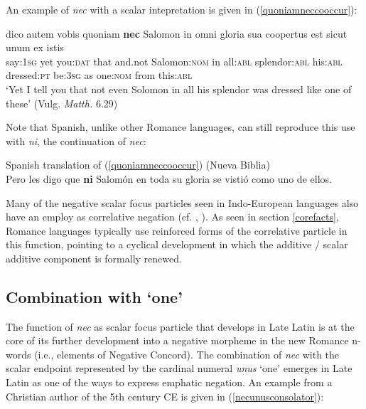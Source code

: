 \documentclass[output=paper,modfonts,nonflat,citecolor=brown,
showindex
]{langsci/langscibook}
\begin{document}
An example of {\emph{nec}} with a scalar intepretation is given in (\ref{quoniamneccooccur}):

{\begin{exe}
\ex \label{quoniamneccooccur} \gll dico autem vobis quoniam {\textbf{nec}} Salomon in omni gloria sua coopertus est sicut unum ex istis\\
say:{\textsc{1sg}} yet you:{\textsc{dat}} that and.not Salomon:{\textsc{nom}} in all:{\textsc{abl}} splendor:{\textsc{abl}} his:{\textsc{abl}} dressed:{\textsc{pt}} be:{\textsc{3sg}} as one:{\textsc{nom}} from this:{\textsc{abl}}\\

`Yet I tell you that not even Solomon in all his splendor was dressed like one of these' (Vulg. {\emph{Matth.}} 6.29)
\end{exe}}

\noindent Note that Spanish, unlike other Romance languages, can still reproduce this use with {\emph{ni}}, the continuation of {\emph{nec}}:

{\begin{exe}
\ex Spanish translation of (\ref{quoniamneccooccur}) (Nueva Biblia)\\
Pero les digo que {\textbf{ni}} Salom\'on en toda su gloria se visti\'o como uno de ellos.
\end{exe}}

\noindent Many of the negative scalar focus particles seen in Indo-European languages also have an employ as correlative negation (cf. \citealt[chapter 4]{Koenig91}, \citealt[]{Haspelmath07}). As seen in section \ref{corefacts}, Romance languages typically use reinforced forms of the correlative particle in this function, pointing to a cyclical development in which the additive / scalar additive component is formally renewed.

\subsection{Combination with `one'}

The function of {\emph{nec}} as scalar focus particle that develops in Late Latin is at the core of its further development into a negative morpheme in the new Romance n-words (i.e., elements of Negative Concord). The combination of {\emph{nec}} with the scalar endpoint represented by the cardinal numeral {\emph{unus}} `one' emerges in Late Latin as one of the ways to express emphatic negation. An example from a Christian author of the 5th century CE is given in (\ref{necunusconsolator}):
\end{document}
